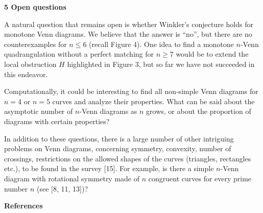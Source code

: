 \par\medskip\noindent\textbf{5 Open questions}\par
A natural question that remains open is whether Winkler’s conjecture holds for monotone Venn diagrams. We believe that the answer is “no”, but there are no counterexamples for $n\leq 6$ (recall Figure 4). One idea to find a monotone $n$-Venn quadrangulation without a perfect matching for $n\geq 7$ would be to extend the local obstruction $H$ highlighted in Figure 3, but so far we have not succeeded in this endeavor.
\par
\par
Computationally, it could be interesting to find all non-simple Venn diagrams for $n=4$ or $n=5$ curves and analyze their properties. What can be said about the asymptotic number of $n$-Venn diagrams as $n$ grows, or about the proportion of diagrams with certain properties?
\par
\par
In addition to these questions, there is a large number of other intriguing problems on Venn diagrams, concerning symmetry, convexity, number of crossings, restrictions on the allowed shapes of the curves (triangles, rectangles etc.), to be found in the survey [15]. For example, is there a simple $n$-Venn diagram with rotational symmetry made of $n$ congruent curves for every prime number $n$ (see [8, 11, 13])?
\par
\par
\par\medskip\noindent\textbf{References}\par
